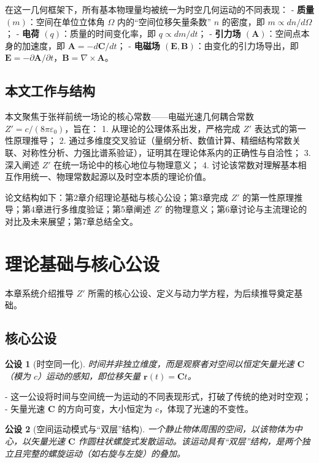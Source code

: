 \documentclass[a4paper,12pt]{article}
\theoremstyle{plain}
\newtheorem{postulate}{公设}[section]
\renewcommand{\vec}[1]{\bm{#1}}
\begin{document}
在这一几何框架下，所有基本物理量均被统一为时空几何运动的不同表现：
- \textbf{质量 $(m)$}：空间在单位立体角 $\Omega$ 内的“空间位移矢量条数” $n$ 的密度，即 $m \propto dn/d\Omega$；
- \textbf{电荷 $(q)$}：质量的时间变化率，即 $q \propto dm/dt$；
- \textbf{引力场 $(\vec{A})$}：空间点本身的加速度，即 $\vec{A} = -d\vec{C}/dt$；
- \textbf{电磁场 $(\vec{E}, \vec{B})$}：由变化的引力场导出，即 $\vec{E} = -\partial\vec{A}/\partial t$，$\vec{B} = \nabla \times \vec{A}$。

\subsection{本文工作与结构}
本文聚焦于张祥前统一场论的核心常数——电磁光速几何耦合常数 $Z' = c/(8\pi\varepsilon_0)$，旨在：
1. 从理论的公理体系出发，严格完成 $Z'$ 表达式的第一性原理推导；
2. 通过多维度交叉验证（量纲分析、数值计算、精细结构常数关联、对称性分析、力强比谱系验证），证明其在理论体系内的正确性与自洽性；
3. 深入阐述 $Z'$ 在统一场论中的核心地位与物理意义；
4. 讨论该常数对理解基本相互作用统一、物理常数起源以及时空本质的理论价值。

论文结构如下：第2章介绍理论基础与核心公设；第3章完成 $Z'$ 的第一性原理推导；第4章进行多维度验证；第5章阐述 $Z'$ 的物理意义；第6章讨论与主流理论的对比及未来展望；第7章总结全文。

\section{理论基础与核心公设}
本章系统介绍推导 $Z'$ 所需的核心公设、定义与动力学方程，为后续推导奠定基础。

\subsection{核心公设}

\begin{postulate}[时空同一化]
时间并非独立维度，而是观察者对空间以恒定矢量光速 $\vec{C}$（模为 $c$）运动的感知，即位移矢量 $\vec{r}(t) = \vec{C}t$。
\end{postulate}

- 这一公设将时间与空间统一为运动的不同表现形式，打破了传统的绝对时空观；
- 矢量光速 $\vec{C}$ 的方向可变，大小恒定为 $c$，体现了光速的不变性。

\begin{postulate}[空间运动模式与“双层”结构]
一个静止物体周围的空间，以该物体为中心，以矢量光速 $\vec{C}$ 作圆柱状螺旋式发散运动。该运动具有“双层”结构，是两个独立且完整的螺旋运动（如右旋与左旋）的叠加。
\end{postulate}
\end{document}
